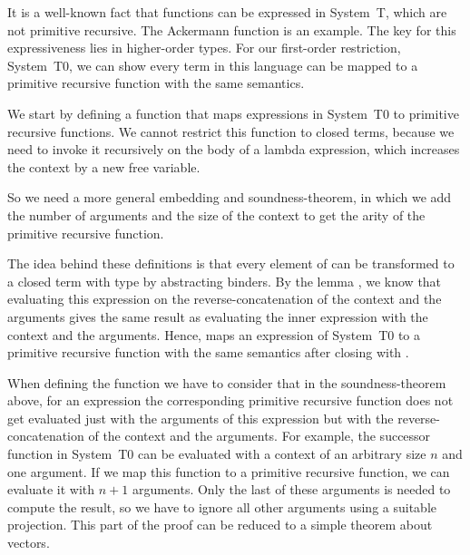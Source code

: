 \documentclass{jfp}
\begin{document}
It is a well-known fact that functions can be expressed in System~T,
which are not primitive recursive. The Ackermann function is an
example. The key for this expressiveness lies in higher-order
types. For our first-order restriction, System~T0, we can show every
term in this language can be mapped to a primitive recursive function
with the same semantics.  

We start by defining a function that maps expressions in System~T0 to primitive recursive functions.
We cannot restrict this function to closed terms, because we need to
invoke it recursively on the body of a lambda expression, which
increases the context by a new free variable.  


So we need a more general embedding and soundness-theorem, in which we
add the number of arguments and the size of the context to get the
arity of the primitive recursive function. 



\sTtoPRSignature

\sTtoPRSoundSig

The idea behind these definitions is that every element of
 can be transformed to a closed term with type
 by abstracting  binders. By
the lemma , we know that evaluating this
expression on the reverse-concatenation of the context and the arguments
gives the same result as evaluating the inner expression with the
context and the arguments. 
Hence,  maps an expression of System~T0 to 
a primitive recursive function with the same semantics after closing with  .

When defining the function  we have to consider
that in the soundness-theorem above, for an expression the
corresponding primitive recursive function 
does not get evaluated just with the arguments of this expression but with the reverse-concatenation of the context and the arguments.
%
For example, the successor function in System~T0 can be evaluated with
a context of an arbitrary size $n$ and one argument. If we map this
function to a primitive recursive function, we can evaluate it with $n
+ 1$ arguments. Only the last of these arguments is needed to compute
the result, so we have to ignore all other arguments using a suitable projection. 
\sTtoPRSuc
This part of the proof can be reduced to a simple theorem about vectors. 
\sTtoPRSoundSuc
\lookupFromN
\end{document}
